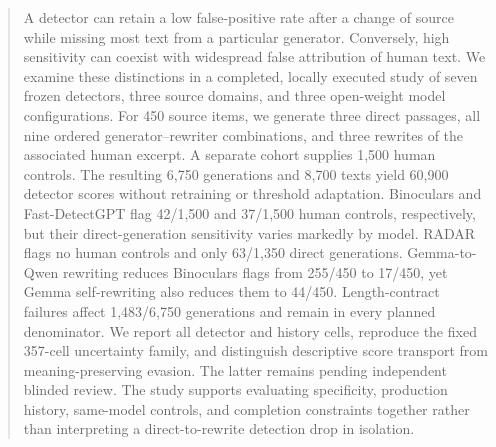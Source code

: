 \begin{abstract}
A detector can retain a low false-positive rate after a change of source while missing most text from a particular generator. Conversely, high sensitivity can coexist with widespread false attribution of human text. We examine these distinctions in a completed, locally executed study of seven frozen detectors, three source domains, and three open-weight model configurations. For 450 source items, we generate three direct passages, all nine ordered generator--rewriter combinations, and three rewrites of the associated human excerpt. A separate cohort supplies 1,500 human controls. The resulting 6,750 generations and 8,700 texts yield 60,900 detector scores without retraining or threshold adaptation. Binoculars and Fast-DetectGPT flag 42/1,500 and 37/1,500 human controls, respectively, but their direct-generation sensitivity varies markedly by model. RADAR flags no human controls and only 63/1,350 direct generations. Gemma-to-Qwen rewriting reduces Binoculars flags from 255/450 to 17/450, yet Gemma self-rewriting also reduces them to 44/450. Length-contract failures affect 1,483/6,750 generations and remain in every planned denominator. We report all detector and history cells, reproduce the fixed 357-cell uncertainty family, and distinguish descriptive score transport from meaning-preserving evasion. The latter remains pending independent blinded review. The study supports evaluating specificity, production history, same-model controls, and completion constraints together rather than interpreting a direct-to-rewrite detection drop in isolation.
\end{abstract}
